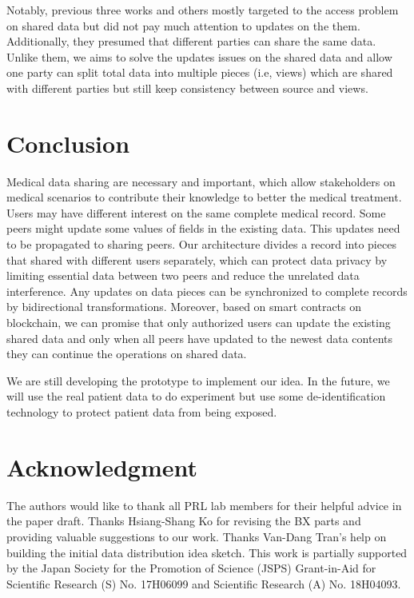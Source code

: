 \documentclass[conference]{IEEEtran}
\begin{document}
Notably, previous three works and others \cite{liu2018bpds,xia2017bbds,amofa2018blockchain,dagher2018ancile,fan2018medblock} mostly targeted to the access problem on shared data but did not pay much attention to updates on the them. Additionally, they presumed that different parties can share the same data. Unlike them, we aims to solve the updates issues on the shared data and allow one party can split total data into multiple pieces (i.e, views) which are shared with different parties but still keep consistency between source and views.

\section{Conclusion}
\label{conclude}

Medical data sharing are necessary and important, which allow stakeholders on medical scenarios to contribute their knowledge to better the medical treatment. Users may have different interest on the same complete medical record. Some peers might update some values of fields in the existing data. This updates need to be propagated to sharing peers. Our architecture divides a record into pieces that shared with different users separately, which can protect data privacy by limiting essential data between two peers and reduce the unrelated data interference. Any updates on data pieces can be synchronized to complete records by bidirectional transformations. Moreover, based on smart contracts on blockchain, we can promise that only authorized users can update the existing shared data and only when all peers have updated to the newest data contents they can continue the operations on shared data.   

We are still developing the prototype to implement our idea.
In the future, we will use the real patient data to do experiment but use some de-identification technology to protect patient data from being exposed. 

\section*{Acknowledgment}
The authors would like to thank all PRL lab members for their helpful advice in the paper draft.  Thanks Hsiang-Shang Ko for revising the BX parts and providing valuable suggestions to our work. Thanks Van-Dang Tran's help on building the initial data distribution idea sketch. This work is partially supported by the Japan Society for the Promotion of Science (JSPS) Grant-in-Aid for Scientific Research (S) No. 17H06099 and Scientific Research (A) No. 18H04093.



\end{document}
